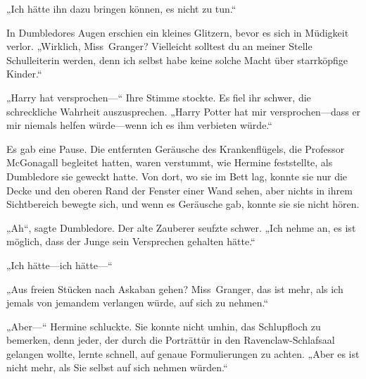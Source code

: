 „Ich hätte ihn dazu bringen können, es nicht zu tun.“

In Dumbledores Augen erschien ein kleines Glitzern, bevor es sich in Müdigkeit verlor. „Wirklich, Miss~Granger? Vielleicht solltest du an meiner Stelle Schulleiterin werden, denn ich selbst habe keine solche Macht über starrköpfige Kinder.“

„Harry hat versprochen—“ Ihre Stimme stockte. Es fiel ihr schwer, die schreckliche Wahrheit auszusprechen. „Harry Potter hat mir versprochen—dass er mir niemals helfen würde—wenn ich es ihm verbieten würde.“

Es gab eine Pause.
Die entfernten Geräusche des Krankenflügels, die Professor McGonagall begleitet hatten, waren verstummt, wie Hermine feststellte, als Dumbledore sie geweckt hatte. Von dort, wo sie im Bett lag, konnte sie nur die Decke und den oberen Rand der Fenster einer Wand sehen, aber nichts in ihrem Sichtbereich bewegte sich, und wenn es Geräusche gab, konnte sie sie nicht hören.

„Ah“, sagte Dumbledore. Der alte Zauberer seufzte schwer. „Ich nehme an, es ist möglich, dass der Junge sein Versprechen gehalten hätte.“

„Ich hätte—ich hätte—“

„Aus freien Stücken nach Askaban gehen? Miss~Granger, das ist mehr, als ich jemals von jemandem verlangen würde, auf sich zu nehmen.“

„Aber—“ Hermine schluckte. Sie konnte nicht umhin, das Schlupfloch zu bemerken, denn jeder, der durch die Porträttür in den Ravenclaw-Schlafsaal gelangen wollte, lernte schnell, auf genaue Formulierungen zu achten. „Aber es ist nicht mehr, als Sie selbst auf sich nehmen würden.“


